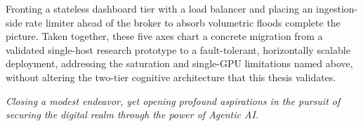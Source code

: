 Fronting a stateless dashboard tier with a load balancer and placing an ingestion-side rate limiter ahead of the broker to absorb volumetric floods complete the picture. Taken together, these five axes chart a concrete migration from a validated single-host research prototype to a fault-tolerant, horizontally scalable deployment, addressing the saturation and single-GPU limitations named above, without altering the two-tier cognitive architecture that this thesis validates.

\vspace{1cm}
\begin{flushright}
    \textit{Closing a modest endeavor, yet opening profound aspirations in the pursuit of securing the digital realm through the power of Agentic AI.}
\end{flushright}
